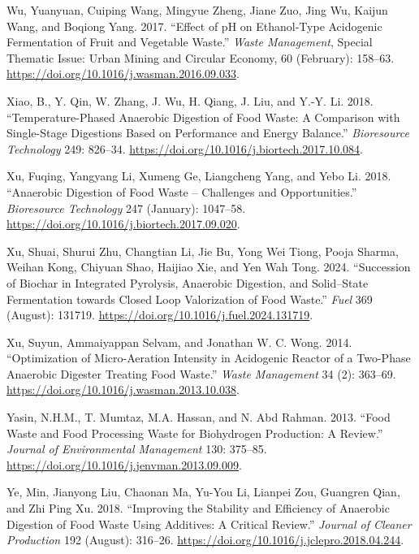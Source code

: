 \documentclass[11pt]{report}
\begin{document}
\begin{hangparas}{1.5em}{1}
\hypertarget{citeproc_bib_item_85}{Wu, Yuanyuan, Cuiping Wang, Mingyue Zheng, Jiane Zuo, Jing Wu, Kaijun Wang, and Boqiong Yang. 2017. “Effect of pH on Ethanol-Type Acidogenic Fermentation of Fruit and Vegetable Waste.” \textit{Waste Management}, Special Thematic Issue: Urban Mining and Circular Economy, 60 (February): 158–63. \url{https://doi.org/10.1016/j.wasman.2016.09.033}.}

\hypertarget{citeproc_bib_item_86}{Xiao, B., Y. Qin, W. Zhang, J. Wu, H. Qiang, J. Liu, and Y.-Y. Li. 2018. “Temperature-Phased Anaerobic Digestion of Food Waste: A Comparison with Single-Stage Digestions Based on Performance and Energy Balance.” \textit{Bioresource Technology} 249: 826–34. \url{https://doi.org/10.1016/j.biortech.2017.10.084}.}

\hypertarget{citeproc_bib_item_87}{Xu, Fuqing, Yangyang Li, Xumeng Ge, Liangcheng Yang, and Yebo Li. 2018. “Anaerobic Digestion of Food Waste – Challenges and Opportunities.” \textit{Bioresource Technology} 247 (January): 1047–58. \url{https://doi.org/10.1016/j.biortech.2017.09.020}.}

\hypertarget{citeproc_bib_item_88}{Xu, Shuai, Shurui Zhu, Changtian Li, Jie Bu, Yong Wei Tiong, Pooja Sharma, Weihan Kong, Chiyuan Shao, Haijiao Xie, and Yen Wah Tong. 2024. “Succession of Biochar in Integrated Pyrolysis, Anaerobic Digestion, and Solid–State Fermentation towards Closed Loop Valorization of Food Waste.” \textit{Fuel} 369 (August): 131719. \url{https://doi.org/10.1016/j.fuel.2024.131719}.}

\hypertarget{citeproc_bib_item_89}{Xu, Suyun, Ammaiyappan Selvam, and Jonathan W. C. Wong. 2014. “Optimization of Micro-Aeration Intensity in Acidogenic Reactor of a Two-Phase Anaerobic Digester Treating Food Waste.” \textit{Waste Management} 34 (2): 363–69. \url{https://doi.org/10.1016/j.wasman.2013.10.038}.}

\hypertarget{citeproc_bib_item_90}{Yasin, N.H.M., T. Mumtaz, M.A. Hassan, and N. Abd Rahman. 2013. “Food Waste and Food Processing Waste for Biohydrogen Production: A Review.” \textit{Journal of Environmental Management} 130: 375–85. \url{https://doi.org/10.1016/j.jenvman.2013.09.009}.}

\hypertarget{citeproc_bib_item_91}{Ye, Min, Jianyong Liu, Chaonan Ma, Yu-You Li, Lianpei Zou, Guangren Qian, and Zhi Ping Xu. 2018. “Improving the Stability and Efficiency of Anaerobic Digestion of Food Waste Using Additives: A Critical Review.” \textit{Journal of Cleaner Production} 192 (August): 316–26. \url{https://doi.org/10.1016/j.jclepro.2018.04.244}.}


\end{hangparas}
\end{document}
